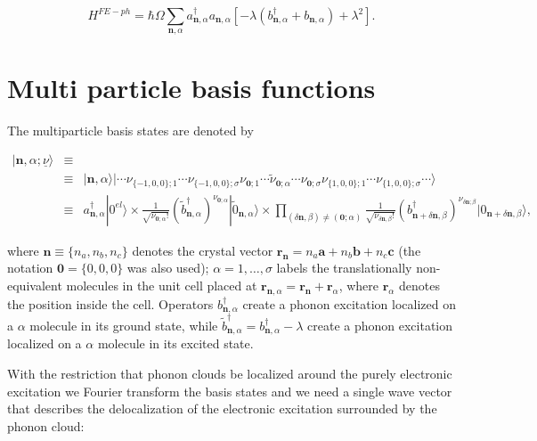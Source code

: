 \documentclass[pt12]{article}
\newcommand{\bfr}{\mathbf{r}}
\newcommand{\bfn}{\mathbf{n}}
\begin{document}
\begin{equation}\label{H_FE-ph}
H^{FE-ph}=\hbar\Omega\sum_{\bfn,\alpha}a^\dagger_{\bfn,\alpha}a_{\bfn,\alpha}
\left[-\lambda\left(b^\dagger_{\bfn,\alpha}+b_{\bfn,\alpha}\right)+\lambda^2\right].
\end{equation}

\section{Multi particle basis functions}

The multiparticle basis states are denoted by

\begin{eqnarray}\label{MP_states}
| \bfn,\alpha ; \underline{\nu}\rangle &\equiv& \\
\nonumber &\equiv& | \bfn,\alpha \rangle | \cdots
\nu_{\{-1,0,0\};1}\cdots\nu_{\{-1,0,0\};\sigma}
\nu_{\textbf{0};1}\cdots \tilde{\nu}_{\textbf{0};\alpha} \cdots
\nu_{\textbf{0};\sigma}
\nu_{\{1,0,0\};1}\cdots\nu_{\{1,0,0\};\sigma}\cdots \rangle \\
\nonumber &\equiv& a^\dagger_{\bfn,\alpha}|0^{el}\rangle \times
\frac{1}{\sqrt{\nu_{\textbf{0};\alpha}!}}\left(
\tilde{b}^\dagger_{\bfn,\alpha}\right)^{\nu_{\textbf{0};\alpha}}|\tilde{0}_{\bfn,\alpha}\rangle
\times \prod_{(\delta\bfn,\beta)\neq (\textbf{0};\alpha)}
\frac{1}{\sqrt{\nu_{\delta\bfn,\beta}!}}\left(
b^\dagger_{\bfn+\delta\bfn,\beta}\right)^{\nu_{\delta\bfn;\beta}}|0_{\bfn+\delta\bfn,\beta}\rangle,
\end{eqnarray}

where $\bfn\equiv\{n_a,n_b,n_c\}$ denotes the crystal vector
$\bfr_\bfn=n_a \textbf{a}+n_b \textbf{b}+n_c \textbf{c}$ (the
notation $\textbf{0}=\{0,0,0\}$ was also used);
$\alpha=1,\ldots,\sigma$ labels the translationally non-equivalent
molecules in the unit cell placed at
$\bfr_{\bfn,\alpha}=\bfr_\bfn+\bfr_\alpha$, where $\bfr_\alpha$
denotes the position inside the cell. Operators
$b^\dagger_{\bfn,\alpha}$ create a phonon excitation localized on a
$\alpha$ molecule in its ground state, while
$\tilde{b}^\dagger_{\bfn,\alpha}=b^\dagger_{\bfn,\alpha}-\lambda$
create a phonon excitation localized on a $\alpha$ molecule in its
excited state.

With the restriction that phonon clouds be localized around the
purely electronic excitation we Fourier transform the basis states
and we need a single wave vector that describes the delocalization
of the electronic excitation surrounded by the phonon cloud:
\end{document}
